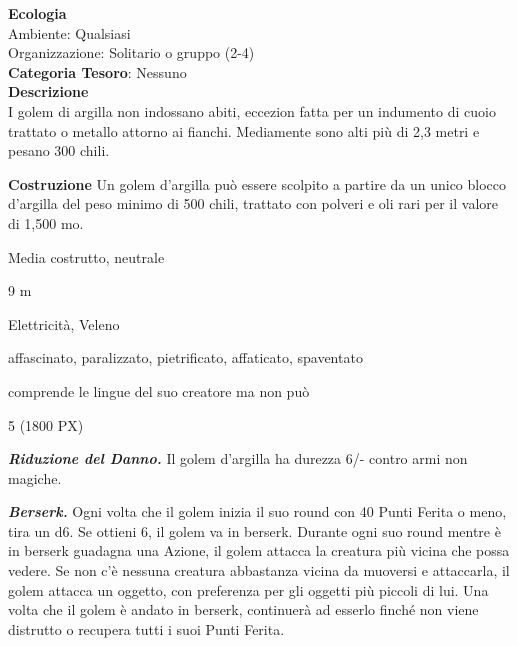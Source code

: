 \begin{multicols}{2}
{\textbf{Ecologia}\\
Ambiente: Qualsiasi\\
Organizzazione: Solitario o gruppo (2-4)\\
\textbf{Categoria Tesoro}: Nessuno\\
\textbf{Descrizione}\\
I golem di argilla non indossano abiti, eccezion fatta per un indumento di cuoio trattato o metallo attorno ai fianchi. Mediamente sono alti più di 2,3 metri e pesano 300 chili.

\textbf{Costruzione}
Un golem d'argilla può essere scolpito a partire da un unico blocco d'argilla del peso minimo di 500 chili, trattato con polveri e oli rari per il valore di 1,500 mo.

\begin{description}[noitemsep, topsep=0pt, parsep=0pt, partopsep=0pt, itemsep=1pt, leftmargin=2.35cm,  labelwidth=2.2cm, itemindent=0cm, listparindent=0pt] %
\setlength{\baselineskip}{10pt}
\item[\textbf{Taglia/Tipo}] Media costrutto, neutrale
\item[\textbf{Caratt.}] 
\item[\textbf{Punti Ferita}] 
\item[\textbf{Movimento}] 9 m
\item[\textbf{Tiri Salvez.}] 
\item[\textbf{Imm. Danni}] Elettricità, Veleno
\item[\textbf{Immunità}] affascinato, paralizzato, pietrificato, affaticato, spaventato
\item[\textbf{Sensi}] 
\item[\textbf{Linguaggi}] comprende le lingue del suo creatore ma non può
\item[\textbf{Sfida}] 5 (1800 PX)
\end{description}
\smallskip

\emph{\textbf{Riduzione del Danno.}} Il golem d'argilla ha durezza 6/- contro armi non magiche.

\emph{\textbf{Berserk.}} Ogni volta che il golem inizia il suo round con 40 Punti Ferita o meno, tira un d6. Se ottieni 6, il golem va in berserk. Durante ogni suo round mentre è in berserk guadagna una Azione, il golem attacca la creatura più vicina che possa vedere. Se non c'è nessuna creatura abbastanza vicina da muoversi e attaccarla, il golem attacca un oggetto, con preferenza per gli oggetti più piccoli di lui. Una volta che il golem è andato in berserk, continuerà ad esserlo finché non viene distrutto o recupera tutti i suoi Punti Ferita.

}
\end{multicols}
